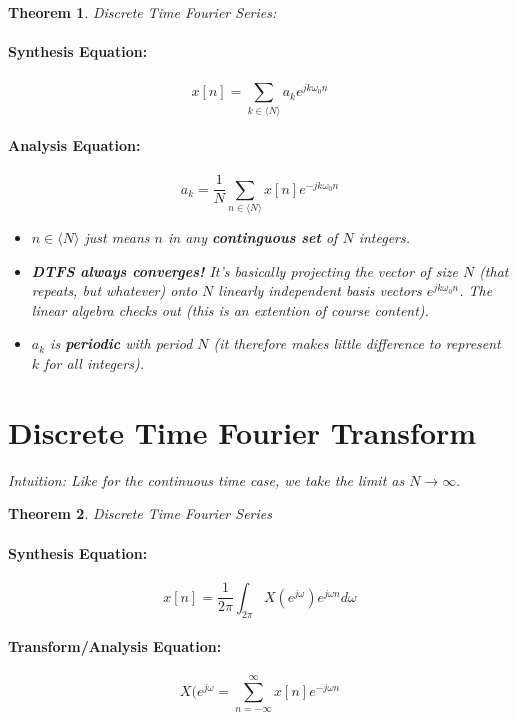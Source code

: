 \documentclass[a4paper,12pt]{report}
\newtheorem{theorem}{Theorem}
\begin{document}
\begin{theorem}{Discrete Time Fourier Series: }
\paragraph{Synthesis Equation: } 
\begin{equation}
x[n] = \sum_{k\in \langle N \rangle}^{} a_k e^{jk\omega_0 n}
\end{equation}

\paragraph{Analysis Equation: } 
\begin{equation}
a_k = \frac{1}{N} \sum_{n\in \langle N \rangle}^{} x[n] e^{-jk\omega_0 n}
\end{equation}

\begin{itemize}
\item $n\in \langle N \rangle$ just means $n$ in any \textbf{continguous set} of $N$ integers. 
\item \textbf{DTFS always converges!} It's basically projecting the vector of size $N$ (that repeats, but whatever) onto $N$ linearly independent basis vectors $e^{jk\omega_0 n}$. The linear algebra checks out (this is an extention of course content). 
\item $a_k$ is \textbf{periodic} with period $N$ (it therefore makes little difference to represent $k$ for all integers). 
\end{itemize}
\end{theorem}

\section{Discrete Time Fourier Transform}

\textit{Intuition: Like for the continuous time case, we take the limit as $N\to \infty$}.

\begin{theorem}{Discrete Time Fourier Series}
\paragraph{Synthesis Equation: } 
\begin{equation}
x[n] = \frac{1}{2\pi} \int_{2\pi}^{} X(e^{j\omega}) e^{j\omega n} d\omega
\end{equation}

\paragraph{Transform/Analysis Equation: } 
\begin{equation}
X(e^{j\omega} = \sum_{n=-\infty}^{\infty} x[n] e^{-j\omega n}
\end{equation}

\end{theorem}
\end{document}
